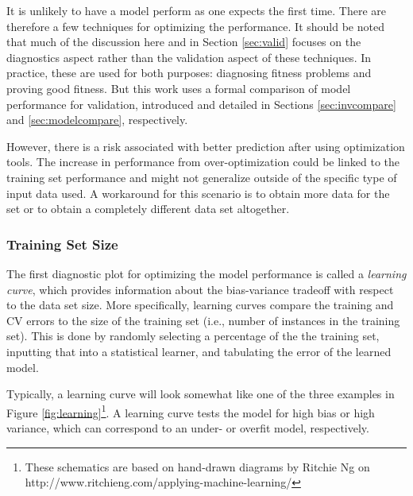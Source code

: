 It is unlikely to have a model perform as one expects the first time. There are
therefore a few techniques for optimizing the performance. It should be noted
that much of the discussion here and in Section \ref{sec:valid} focuses on the
diagnostics aspect rather than the validation aspect of these techniques. In
practice, these are used for both purposes: diagnosing fitness problems and
proving good fitness.  But this work uses a formal comparison of model
performance for validation, introduced and detailed in Sections
\ref{sec:invcompare} and \ref{sec:modelcompare}, respectively. 

However, there is a risk associated with better prediction after using
optimization tools.  The increase in performance from over-optimization could
be linked to the training set performance and might not generalize outside of
the specific type of input data used.  A workaround for this scenario is to
obtain more data for the set or to obtain a completely different data set
altogether. 

\subsubsection{Training Set Size}

The first diagnostic plot for optimizing the model performance is called a
\textit{learning curve}, which provides information about the bias-variance
tradeoff with respect to the data set size. More specifically, learning curves
compare the training and \gls{CV} errors to the size of the training
set (i.e., number of instances in the training set). This is done by randomly
selecting a percentage of the the training set, inputting that into a
statistical learner, and tabulating the error of the learned model. 

Typically, a learning curve will look somewhat like one of the three examples
in Figure \ref{fig:learning}\footnote{These schematics are based on hand-drawn
diagrams by Ritchie Ng on http://www.ritchieng.com/applying-machine-learning/}.
A learning curve tests the model for high bias or high variance, which can
correspond to an under- or overfit model, respectively. 

